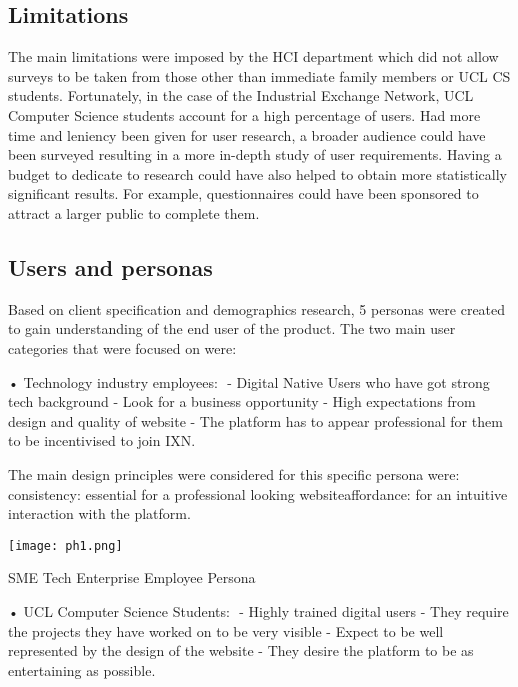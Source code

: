 \documentclass[fontsize=11pt]{extarticle}
\numberwithin{figure}{section} %
\begin{document}
\hypertarget{limitations}{%
\subsection{Limitations}\label{limitations}}

The main limitations were imposed by the HCI department which did not
allow surveys to be taken from those other than immediate family members
or UCL CS students. Fortunately, in the case of the Industrial Exchange
Network, UCL Computer Science students account for a high percentage of
users. Had more time and leniency been given for user research, a
broader audience could have been surveyed resulting in a more in-depth
study of user requirements. Having a budget to dedicate to research
could have also helped to obtain more statistically significant results.
For example, questionnaires could have been sponsored to attract a
larger public to complete them.

\hypertarget{users-and-personas}{%
\subsection{Users and personas}\label{users-and-personas}}

Based on client specification and demographics research, 5 personas were
created to gain understanding of the end user of the product. The two
main user categories that were focused on were: ​

• Technology industry employees: ​ - Digital Native Users who have got
strong tech background​ - Look for a business opportunity​ - High
expectations from design and quality of website​ - The platform has to
appear professional for them to be incentivised to join IXN​.

The main design principles were considered for this specific persona
were: ​ consistency: essential for a professional looking website​
affordance: for an intuitive interaction with the platform. ​

\begin{table}[H]
      \centering
      \texttt{[image: ph1.png]}
      \caption{SME Tech Enterprise Employee Persona}
\end{table}

• UCL Computer Science Students: ​ - Highly trained digital users​ -
They require the projects they have worked on to be very visible​ -
Expect to be well represented by the design of the website​ - They
desire the platform to be as entertaining as possible. ​
\end{document}
